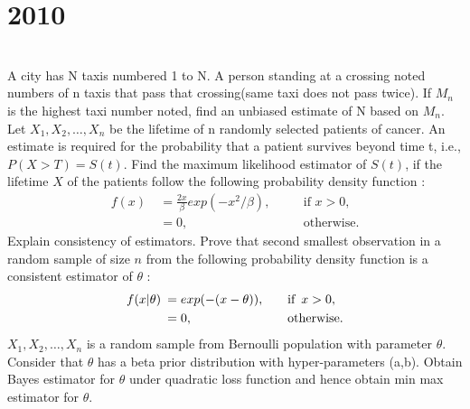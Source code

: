 \section*{2010}
\vspace{-.5cm}
\hrulefill \smallskip\\
 A city has N taxis numbered 1 to N. A person standing at a crossing noted numbers of n taxis that pass that crossing(same taxi does not pass twice). If $M_n$ is the highest taxi number noted, find an unbiased estimate of N based on $M_n$.
\myline
{} Let $X_1, X_2,\dotsc, X_n$ be the lifetime of n randomly selected patients of cancer. An estimate is required for the probability that a patient survives beyond time t, i.e., $P(X>T) = S(t)$. Find the maximum likelihood estimator of $S(t)$, if the lifetime $X$ of the patients follow the following probability density function :
\[ 
\begin{aligned}
    f(x) \: &= \frac{2x}{\beta}exp(-x^2/\beta),\quad && \text{if } x > 0, \\
            &= 0, && \text{otherwise.}
\end{aligned}
\]
 Explain consistency of estimators. Prove that second smallest observation in a random sample of size $n$ from the following probability density function is a consistent estimator of $\theta$ : 
\[\begin{aligned}
    f(x | \theta) \: &= exp(-(x-\theta)),\quad && \text{if} \enskip x > 0, \\
            &= 0, && \text{otherwise.}
\end{aligned}\]
 $X_1, X_2,\dotsc,X_n$ is a random sample from Bernoulli population with parameter $\theta$. Consider that $\theta$ has a beta prior distribution with hyper-parameters (a,b). Obtain Bayes estimator for $\theta$ under quadratic loss function and hence obtain min max estimator for $\theta$.